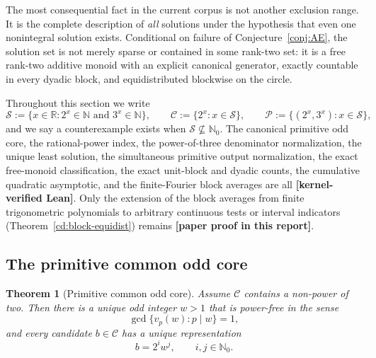 \documentclass[11pt,oneside]{article}
\newtheorem{theorem}{Theorem}[section]
\theoremstyle{definition}
\theoremstyle{remark}
\newcommand{\N}{\mathbb N}
\newcommand{\Nzero}{\mathbb N_0}
\newcommand{\R}{\mathbb R}
\newcommand{\Sol}{\mathcal S}
\newcommand{\Cand}{\mathcal C}
\newcommand{\Pair}{\mathcal P}
\newcommand{\vpp}[2]{v_{#1}\!\left(#2\right)}
\newcommand{\statuslean}{\textcolor{leanblue}{\textbf{[kernel-verified Lean]}}}
\newcommand{\statusnew}{\textcolor{newgreen}{\textbf{[paper proof in this report]}}}
\begin{document}
The most consequential fact in the current corpus is not another exclusion range.  It is the
complete description of \emph{all} solutions under the hypothesis that even one nonintegral
solution exists.  Conditional on failure of Conjecture~\ref{conj:AE}, the solution set is not
merely sparse or contained in some rank-two set: it is a free rank-two additive monoid with an
explicit canonical generator, exactly countable in every dyadic block, and equidistributed
blockwise on the circle.

Throughout this section we write
\[
 \Sol:=\{x\in\R:2^x\in\N\text{ and }3^x\in\N\},\qquad
 \Cand:=\{2^x:x\in\Sol\},\qquad
 \Pair:=\{(2^x,3^x):x\in\Sol\},
\]
and we say a counterexample exists when $\Sol\not\subseteq\Nzero$.  The canonical primitive odd
core, the rational-power index, the power-of-three denominator normalization, the unique least
solution, the simultaneous primitive output normalization, the exact free-monoid
classification, the exact unit-block and dyadic counts, the cumulative quadratic asymptotic,
and the finite-Fourier block averages are all \statuslean{}.  Only the extension of the block
averages from finite trigonometric polynomials to arbitrary continuous tests or interval
indicators (Theorem~\ref{cd:block-equidist}) remains \statusnew{}.

\subsection{The primitive common odd core}

\begin{theorem}[Primitive common odd core]
\label{cd:odd-core}
Assume $\Cand$ contains a non-power of two.  Then there is a unique odd integer $w>1$ that is
power-free in the sense
\[
\gcd\{\vpp{p}{w}:p\mid w\}=1,
\]
and every candidate $b\in\Cand$ has a unique representation
\[
b=2^iw^j,\qquad i,j\in\Nzero.
\]
\end{theorem}
\end{document}
